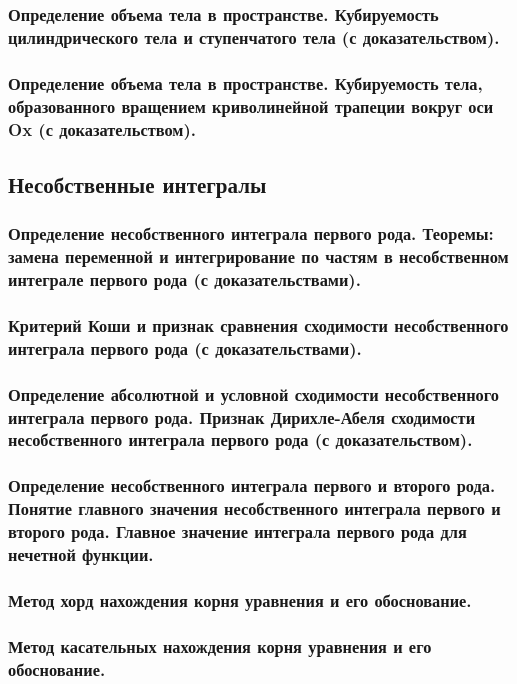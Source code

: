 \documentclass[10pt]{article}
\begin{document}
    \subsubsection{Определение объема тела в пространстве. Кубируемость цилиндрического тела и ступенчатого тела (с доказательством).}
    \subsubsection{Определение объема тела в пространстве. Кубируемость тела, образованного вращением криволинейной трапеции вокруг оси Ox (с доказательством).}
    \subsection{Несобственные интегралы}
    \subsubsection{Определение несобственного интеграла первого рода. Теоремы: замена переменной и интегрирование по частям в несобственном интеграле первого рода (с доказательствами).}
    \subsubsection{Критерий Коши и признак сравнения сходимости несобственного интеграла первого рода (с доказательствами).}
    \subsubsection{Определение абсолютной и условной сходимости несобственного интеграла первого рода. Признак Дирихле-Абеля сходимости несобственного интеграла первого рода (с доказательством).}
    \subsubsection{Определение несобственного интеграла первого и второго рода. Понятие главного значения несобственного интеграла первого и второго рода. Главное значение интеграла первого рода для нечетной функции.}
    \subsubsection{Метод хорд нахождения корня уравнения и его обоснование.}
    \subsubsection{Метод касательных нахождения корня уравнения и его обоснование.}
\end{document}
